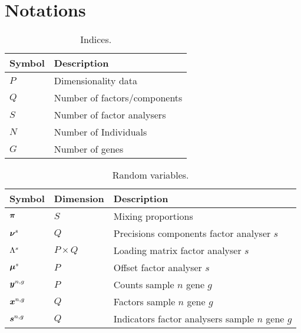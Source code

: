 \documentclass[a4paper]{article}
\begin{document}
\begin{comment}
\subsection{Mixture factor analysers}
\begin{align}
  \bs{y}=\bs{\eta}+\sum_{s=1}^S(\Lambda^s\bs{x}+\bs{\mu}) P(z_s|\bs{\pi})
\end{align}
\begin{align}
  P(\bs{y}|\bs{x},\Lambda,\bs{\mu},\bs{\eta})=\sum_{s=1}^S\mathcal{N}(\bs{y}|\Lambda\bs{x}+\bs{\mu},\Psi)P(z_s|\bs{\pi})
\end{align}
\newpage

\end{comment}

\section{Notations}
\begin{table}[h]
  \begin{center}
  \begin{tabular}{ll}
    \toprule
    Symbol & Description \\ \hline
    $P$ & Dimensionality data \\
    $Q$ & Number of factors/components \\
    $S$ & Number of factor analysers \\
    $N$ & Number of Individuals  \\
    $G$ & Number of genes \\
    \bottomrule
  \end{tabular}
  \caption{Indices.}
  \end{center}
\end{table}
\begin{table}[h]
  \begin{center}
  \begin{tabular}{lll}
    \toprule
    Symbol & Dimension & Description \\ \hline
    $\boldsymbol{\pi}$ & $S$ & Mixing proportions \\
    $\boldsymbol{\nu}^s$ & $Q$ & Precisions components factor analyser $s$ \\
    $\Lambda^s$ & $P \times Q$ & Loading matrix factor analyser $s$ \\
    $\boldsymbol{\mu}^s$ & $P$ & Offset factor analyser $s$ \\
    $\boldsymbol{y}^{n,g}$ & $P$ & Counts sample $n$ gene $g$ \\
    $\boldsymbol{x}^{n,g}$ & $Q$ & Factors sample $n$ gene $g$ \\
    $\boldsymbol{s}^{n,g}$ & $Q$ & Indicators factor analysers sample $n$ gene $g$ \\
    \bottomrule
  \end{tabular}
  \caption{Random variables.}
\end{center}
\end{table}
\end{document}
